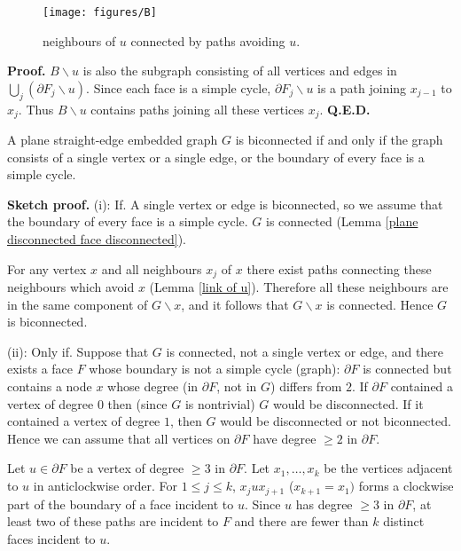 \begin{figure}
\centerline{\texttt{[image: figures/B]}}
\caption{neighbours of $u$ connected by paths avoiding $u$.}
\label{B.fig}
\end{figure}

{\bf Proof.}
$B \backslash u$ is also the subgraph consisting
of all vertices and edges in $\bigcup_j (\partial F_j \backslash u)$.
Since each face is a simple cycle, $\partial F_j \backslash u$
is a path joining $x_{j-1}$ to $x_j$.  Thus
$B \backslash u$ contains paths joining all these vertices
$x_j$. {\bf Q.E.D.}\medskip

\begin{lemma}
\label{planar biconnected} A plane straight-edge embedded graph $G$ is biconnected if and only if
the graph consists of a single vertex or a single edge, or
the boundary of every face is a simple cycle.
\end{lemma}

{\bf Sketch proof.}
(i): If. A single vertex or edge is biconnected, so we
assume that the boundary of every face is a simple cycle.
$G$ is connected (Lemma
\ref{plane disconnected face disconnected}).

For any vertex $x$ and all neighbours $x_j$ of $x$ there
exist paths connecting these neighbours which avoid $x$
(Lemma \ref{link of u}).  Therefore all these neighbours are
in the same component of $G\backslash x$, and it follows that
$G\backslash x$ is connected.  Hence $G$ is biconnected.

(ii): Only if. Suppose that $G$ is connected, not a single vertex
or edge, and there exists a face $F$ whose
boundary is not a simple cycle (graph):
$\partial F$ is connected but
contains a node $x$ whose degree (in $\partial F$, not in $G$)
differs from $2$.  If $\partial F$ contained a vertex  of
degree $0$ then (since $G$ is nontrivial) $G$ would be disconnected.
If it contained a vertex of degree $1$, then $G$ would
be disconnected or not biconnected.  Hence we can assume
that all vertices on $\partial F$ have degree $\geq 2$ in $\partial F$.

Let $u\in \partial F$ be a vertex of degree $\geq 3$ in $\partial F$.  Let
$x_1,\ldots , x_k$ be the vertices adjacent to $u$ in anticlockwise
order.  For $1 \leq j\leq k$, $x_j u x_{j+1}$ ($x_{k+1}=x_1)$ forms a clockwise
part of the boundary of a face incident to $u$.  Since $u$ has
degree $\geq 3$ in $\partial F$, at least two of these
paths are incident to $F$ and there are fewer than $k$
distinct faces incident to $u.$


